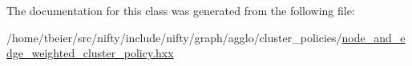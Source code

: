 The documentation for this class was generated from the following file\+:\begin{DoxyCompactItemize}
\item 
/home/tbeier/src/nifty/include/nifty/graph/agglo/cluster\+\_\+policies/\hyperlink{node__and__edge__weighted__cluster__policy_8hxx}{node\+\_\+and\+\_\+edge\+\_\+weighted\+\_\+cluster\+\_\+policy.\+hxx}\end{DoxyCompactItemize}
